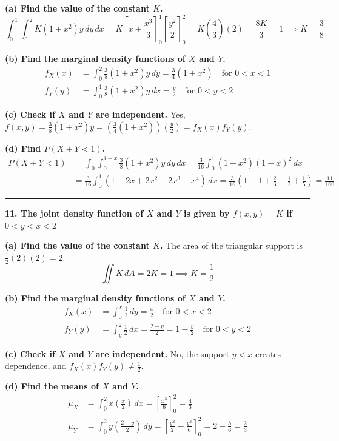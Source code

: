 \documentclass{article}
\begin{document}
\textbf{(a) Find the value of the constant $K$.}
$$\int_{0}^{1} \int_{0}^{2} K(1+x^2)y \,dy \,dx = K \left[x + \frac{x^3}{3}\right]_0^1 \left[\frac{y^2}{2}\right]_0^2 = K\left(\frac{4}{3}\right)(2) = \frac{8K}{3} = 1 \implies K = \frac{3}{8}$$

\textbf{(b) Find the marginal density functions of $X$ and $Y$.}
\begin{align*}
f_X(x) &= \int_{0}^{2} \frac{3}{8}(1+x^2)y \,dy = \frac{3}{4}(1+x^2) \quad \text{for } 0 < x < 1 \\
f_Y(y) &= \int_{0}^{1} \frac{3}{8}(1+x^2)y \,dx = \frac{y}{2} \quad \text{for } 0 < y < 2
\end{align*}

\textbf{(c) Check if $X$ and $Y$ are independent.}
Yes, $f(x,y) = \frac{3}{8}(1+x^2)y = \left( \frac{3}{4}(1+x^2) \right) \left( \frac{y}{2} \right) = f_X(x)f_Y(y)$.

\textbf{(d) Find $P(X +Y < 1)$.}
\begin{align*}
P(X+Y < 1) &= \int_{0}^{1} \int_{0}^{1-x} \frac{3}{8}(1+x^2)y \,dy \,dx = \frac{3}{16} \int_{0}^{1} (1+x^2)(1-x)^2 \,dx \\
&= \frac{3}{16} \int_{0}^{1} (1 - 2x + 2x^2 - 2x^3 + x^4) \,dx = \frac{3}{16} \left( 1 - 1 + \frac{2}{3} - \frac{1}{2} + \frac{1}{5} \right) = \frac{11}{160}
\end{align*}

\vspace{1em}
\hrule
\vspace{1em}

\textbf{11. The joint density function of $X$ and $Y$ is given by $f(x, y) = K$ if $0 < y < x < 2$}

\textbf{(a) Find the value of the constant $K$.}
The area of the triangular support is $\frac{1}{2}(2)(2) = 2$.
$$\iint K \,dA = 2K = 1 \implies K = \frac{1}{2}$$

\textbf{(b) Find the marginal density functions of $X$ and $Y$.}
\begin{align*}
f_X(x) &= \int_{0}^{x} \frac{1}{2} \,dy = \frac{x}{2} \quad \text{for } 0 < x < 2 \\
f_Y(y) &= \int_{y}^{2} \frac{1}{2} \,dx = \frac{2-y}{2} = 1 - \frac{y}{2} \quad \text{for } 0 < y < 2
\end{align*}

\textbf{(c) Check if $X$ and $Y$ are independent.}
No, the support $y < x$ creates dependence, and $f_X(x)f_Y(y) \neq \frac{1}{2}$.

\textbf{(d) Find the means of $X$ and $Y$.}
\begin{align*}
\mu_X &= \int_{0}^{2} x\left(\frac{x}{2}\right) \,dx = \left[ \frac{x^3}{6} \right]_0^2 = \frac{4}{3} \\
\mu_Y &= \int_{0}^{2} y\left(\frac{2-y}{2}\right) \,dy = \left[ \frac{y^2}{2} - \frac{y^3}{6} \right]_0^2 = 2 - \frac{8}{6} = \frac{2}{3}
\end{align*}
\end{document}
